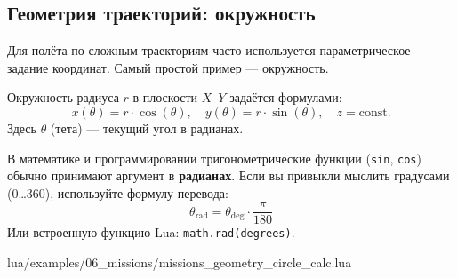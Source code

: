 \subsection{Геометрия траекторий: окружность}

Для полёта по сложным траекториям часто используется параметрическое задание координат. Самый простой пример — окружность.

Окружность радиуса \(r\) в плоскости \(X\)–\(Y\) задаётся формулами:
\[
  x(\theta) = r \cdot \cos(\theta),\quad y(\theta) = r \cdot \sin(\theta),\quad z = \text{const}.
\]
Здесь \(\theta\) (тета) — текущий угол в радианах.

\begin{infobox}
В математике и программировании тригонометрические функции (\texttt{sin}, \texttt{cos}) обычно принимают аргумент в \textbf{радианах}.
Если вы привыкли мыслить градусами (0\dots360), используйте формулу перевода:
\[
  \theta_{\mathrm{rad}} = \theta_{\mathrm{deg}} \cdot \frac{\pi}{180}
\]
Или встроенную функцию Lua: \texttt{math.rad(degrees)}.
\end{infobox}

\begin{codebox}
\begin{codefile}{lua/examples/06_missions/missions_geometry_circle_calc.lua}
\end{codefile}
\end{codebox}
